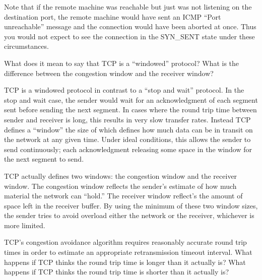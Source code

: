 \documentclass[12pt]{examdesign}
\begin{document}
\begin{shortanswer}
\begin{question}
\begin{answer}
      Note that if the remote machine was reachable but just was not listening on the
      destination port, the remote machine would have sent an ICMP ``Port unreachable'' message
      and the connection would have been aborted at once. Thus you would not expect to see the
      connection in the SYN\_SENT state under these circumstances.
    \end{answer}
  \end{question}

\pagebreak

  \begin{question}
    What does it mean to say that TCP is a ``windowed'' protocol? What is the difference between
    the congestion window and the receiver window?
    
    \begin{answer}
      TCP is a windowed protocol in contrast to a ``stop and wait'' protocol. In the stop and
      wait case, the sender would wait for an acknowledgment of each segment sent before sending
      the next segment. In cases where the round trip time between sender and receiver is long,
      this results in very slow transfer rates. Instead TCP defines a ``window'' the size of
      which defines how much data can be in transit on the network at any given time. Under
      ideal conditions, this allows the sender to send continuously; each acknowledgment
      releasing some space in the window for the next segment to send.
      
      TCP actually defines two windows: the congestion window and the receiver window. The
      congestion window reflects the sender's estimate of how much material the network can
      ``hold.'' The receiver window reflect's the amount of space left in the receiver buffer.
      By using the minimum of these two window sizes, the sender tries to avoid overload either
      the network or the receiver, whichever is more limited.
    \end{answer}
  \end{question}

\pagebreak

  \begin{question}
    TCP's congestion avoidance algorithm requires reasonably accurate round trip times in order
    to estimate an appropriate retransmission timeout interval. What happens if TCP thinks the
    round trip time is longer than it actually is? What happens if TCP thinks the round trip
    time is shorter than it actually is?


\end{question}
\end{shortanswer}
\end{document}
